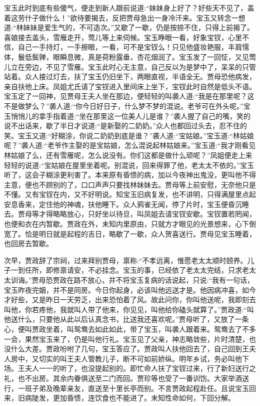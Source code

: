 \begin{parag}
    宝玉此时到底有些傻气，便走到新人跟前说道:“妹妹身上好了？好些天不见了，盖着这劳什子做什么！”欲待要揭去，反把贾母急出一身冷汗来。宝玉又转念一想道:“林妹妹是爱生气的，不可造次。”又歇了一歇，仍是按捺不住，只得上前揭了。喜娘接去盖头，雪雁走开，莺儿等上来伺候。宝玉睁眼一看，好象宝钗，心里不信，自己一手持灯，一手擦眼，一看，可不是宝钗么！只见他盛妆艳服，丰肩懦体，鬟低鬓亸，眼瞬息微，真是荷粉露垂，杏花烟润了。宝玉发了一回怔，又见莺儿立在旁边，不见了雪雁。宝玉此时心无主意，自己反以为是梦中了，呆呆的只管站着。众人接过灯去，扶了宝玉仍旧坐下，两眼直视，半语全无。贾母恐他病发，亲自扶他上床。凤姐尤氏请了宝钗进入里间床上坐下，宝钗此时自然是低头不语。宝玉定了一回神，见贾母王夫人坐在那边，便轻轻的叫袭人道:“我是在那里呢？这不是做梦么？”袭人道:“你今日好日子，什么梦不梦的混说。老爷可在外头呢。”宝玉悄悄儿的拿手指着道:“坐在那里这一位美人儿是谁？”袭人握了自己的嘴，笑的说不出话来，歇了半日才说道:“是新娶的二奶奶。”众人也都回过头去，忍不住的笑。宝玉又道:“好糊涂，你说二奶奶到底是谁？”袭人道:“宝姑娘。”宝玉道:“林姑娘呢？”袭人道:“老爷作主娶的是宝姑娘，怎么混说起林姑娘来。”宝玉道:“我才刚看见林姑娘了么，还有雪雁呢，怎么说没有。你们这都是做什么顽呢？”凤姐便走上来轻轻的说道:“宝姑娘在屋里坐着呢。别混说，回来得罪了他，老太太不依的。”宝玉听了，这会子糊涂更利害了。本来原有昏愦的病，加以今夜神出鬼没，更叫他不得主意，便也不顾别的了，口口声声只要找林妹妹去。贾母等上前安慰，无奈他只是不懂。又有宝钗在内，又不好明说。知宝玉旧病复发，也不讲明，只得满屋里点起安息香来，定住他的神魂，扶他睡下。众人鸦雀无闻，停了片时，宝玉便昏沉睡去。贾母等才得略略放心，只好坐以待旦，叫凤姐去请宝钗安歇。宝钗置若罔闻，也便和衣在内暂歇。贾政在外，未知内里原由，只就方才眼见的光景想来，心下倒宽了。恰是明日就是起程的吉日，略歇了一歇，众人贺喜送行。贾母见宝玉睡着，也回房去暂歇。
\end{parag}


\begin{parag}
    次早，贾政辞了宗祠，过来拜别贾母，禀称:“不孝远离，惟愿老太太顺时颐养。儿子一到任所，即修禀请安，不必挂念。宝玉的事，已经依了老太太完结，只求老太太训诲。”贾母恐贾政在路不放心，并不将宝玉复病的话说起，只说:“我有一句话，宝玉昨夜完姻，并不是同房。今日你起身，必该叫他远送才是。他因病冲喜，如今才好些，又是昨日一天劳乏，出来恐怕着了风。故此问你，你叫他送呢，我即刻去叫他，你若疼他，我就叫人带了他来，你见见，叫他给你磕头就算了。”贾政道:“叫他送什么，只要他从此以后认真念书，比送我还喜欢呢。”贾母听了，又放了一条心，便叫贾政坐着，叫鸳鸯去如此如此，带了宝玉，叫袭人跟着来。鸳鸯去了不多一会，果然宝玉来了，仍是叫他行礼。宝玉见了父亲，神志略敛些，片时清楚，也没什么大差。贾政吩咐了几句，宝玉答应了。贾政叫人扶他回去了，自己回到王夫人房中，又切实的叫王夫人管教儿子，断不可如前娇纵。明年乡试，务必叫他下场。王夫人一一的听了，也没提起别的。即忙命人扶了宝钗过来，行了新妇送行之礼，也不出房。其余内眷俱送至二门而回。贾珍等也受了一番训饬。大家举酒送行，一班子弟及晚辈亲友，直送至十里长亭而别。不言贾政起程赴任。且说宝玉回来，旧病陡发，更加昏愦，连饮食也不能进了。未知性命如何，下回分解。
\end{parag}
